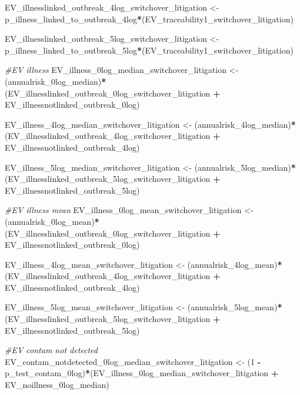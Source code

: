 \documentclass[
]{article}
\newenvironment{Shaded}{\begin{snugshade}}{\end{snugshade}}
\newcommand{\CommentTok}[1]{\textcolor[rgb]{0.56,0.35,0.01}{\textit{#1}}}
\newcommand{\DecValTok}[1]{\textcolor[rgb]{0.00,0.00,0.81}{#1}}
\newcommand{\NormalTok}[1]{#1}
\newcommand{\OtherTok}[1]{\textcolor[rgb]{0.56,0.35,0.01}{#1}}
\newcommand{\SpecialCharTok}[1]{\textcolor[rgb]{0.81,0.36,0.00}{\textbf{#1}}}
\begin{document}
\begin{Shaded}
\begin{Highlighting}[]
\NormalTok{EV\_illnesslinked\_outbreak\_4log\_switchover\_litigation }\OtherTok{\textless{}{-}}\NormalTok{ p\_illness\_linked\_to\_outbreak\_4log}\SpecialCharTok{*}\NormalTok{(EV\_traceability1\_switchover\_litigation) }

\NormalTok{EV\_illnesslinked\_outbreak\_5log\_switchover\_litigation }\OtherTok{\textless{}{-}}\NormalTok{ p\_illness\_linked\_to\_outbreak\_5log}\SpecialCharTok{*}\NormalTok{(EV\_traceability1\_switchover\_litigation) }

\CommentTok{\#EV illness}
\NormalTok{EV\_illness\_0log\_median\_switchover\_litigation }\OtherTok{\textless{}{-}}\NormalTok{ (annualrisk\_0log\_median)}\SpecialCharTok{*}\NormalTok{(EV\_illnesslinked\_outbreak\_0log\_switchover\_litigation }\SpecialCharTok{+}\NormalTok{ EV\_illnessnotlinked\_outbreak\_0log)}

\NormalTok{EV\_illness\_4log\_median\_switchover\_litigation }\OtherTok{\textless{}{-}}\NormalTok{ (annualrisk\_4log\_median)}\SpecialCharTok{*}\NormalTok{(EV\_illnesslinked\_outbreak\_4log\_switchover\_litigation }\SpecialCharTok{+}\NormalTok{ EV\_illnessnotlinked\_outbreak\_4log)}

\NormalTok{EV\_illness\_5log\_median\_switchover\_litigation }\OtherTok{\textless{}{-}}\NormalTok{ (annualrisk\_5log\_median)}\SpecialCharTok{*}\NormalTok{(EV\_illnesslinked\_outbreak\_5log\_switchover\_litigation }\SpecialCharTok{+}\NormalTok{ EV\_illnessnotlinked\_outbreak\_5log)}


\CommentTok{\#EV illness mean}
\NormalTok{EV\_illness\_0log\_mean\_switchover\_litigation }\OtherTok{\textless{}{-}}\NormalTok{ (annualrisk\_0log\_mean)}\SpecialCharTok{*}\NormalTok{(EV\_illnesslinked\_outbreak\_0log\_switchover\_litigation }\SpecialCharTok{+}\NormalTok{ EV\_illnessnotlinked\_outbreak\_0log)}

\NormalTok{EV\_illness\_4log\_mean\_switchover\_litigation }\OtherTok{\textless{}{-}}\NormalTok{ (annualrisk\_4log\_mean)}\SpecialCharTok{*}\NormalTok{(EV\_illnesslinked\_outbreak\_4log\_switchover\_litigation }\SpecialCharTok{+}\NormalTok{ EV\_illnessnotlinked\_outbreak\_4log)}

\NormalTok{EV\_illness\_5log\_mean\_switchover\_litigation }\OtherTok{\textless{}{-}}\NormalTok{ (annualrisk\_5log\_mean)}\SpecialCharTok{*}\NormalTok{(EV\_illnesslinked\_outbreak\_5log\_switchover\_litigation }\SpecialCharTok{+}\NormalTok{ EV\_illnessnotlinked\_outbreak\_5log)}

\CommentTok{\#EV contam not detected}
\NormalTok{EV\_contam\_notdetected\_0log\_median\_switchover\_litigation }\OtherTok{\textless{}{-}}\NormalTok{ (}\DecValTok{1} \SpecialCharTok{{-}}\NormalTok{ p\_test\_contam\_0log)}\SpecialCharTok{*}\NormalTok{(EV\_illness\_0log\_median\_switchover\_litigation }\SpecialCharTok{+}\NormalTok{ EV\_noillness\_0log\_median)}


\end{Highlighting}
\end{Shaded}
\end{document}
